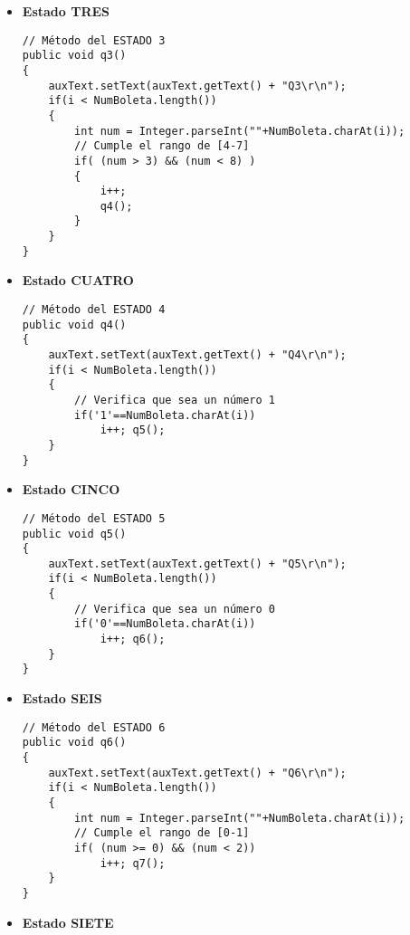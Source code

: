 \documentclass[12pt]{article}
\begin{document}
\begin{itemize}
		\begin{lstlisting}[style=Java]
// Método del ESTADO 2
public void q2()
{
	auxText.setText(auxText.getText() + "Q2\r\n");
	if(i < NumBoleta.length())
	{
		// Verifica que sea un número 1
		if('1'==NumBoleta.charAt(i))
			i++; q3();
	}	
}
		\end{lstlisting}

		\item[$\overrightarrow$] \textbf{Estado TRES}

		\begin{lstlisting}[style=Java]
// Método del ESTADO 3
public void q3()
{
	auxText.setText(auxText.getText() + "Q3\r\n");
	if(i < NumBoleta.length())
	{
		int num = Integer.parseInt(""+NumBoleta.charAt(i));
		// Cumple el rango de [4-7]
		if( (num > 3) && (num < 8) )
		{
			i++; 
			q4();
		}
	}
}
		\end{lstlisting}

		\item[$\overrightarrow$] \textbf{Estado CUATRO}

		\begin{lstlisting}[style=Java]
// Método del ESTADO 4
public void q4()
{
	auxText.setText(auxText.getText() + "Q4\r\n");
	if(i < NumBoleta.length())
	{
		// Verifica que sea un número 1
		if('1'==NumBoleta.charAt(i))
			i++; q5();
	}	
}
		\end{lstlisting}
\newpage

		\item[$\overrightarrow$] \textbf{Estado CINCO}

		\begin{lstlisting}[style=Java]
// Método del ESTADO 5
public void q5()
{
	auxText.setText(auxText.getText() + "Q5\r\n");
	if(i < NumBoleta.length())
	{
		// Verifica que sea un número 0
		if('0'==NumBoleta.charAt(i))
			i++; q6();
	}	
}
		\end{lstlisting}

		\item[$\overrightarrow$] \textbf{Estado SEIS}

		\begin{lstlisting}[style=Java]
// Método del ESTADO 6
public void q6()
{
	auxText.setText(auxText.getText() + "Q6\r\n");
	if(i < NumBoleta.length())
	{
		int num = Integer.parseInt(""+NumBoleta.charAt(i));
		// Cumple el rango de [0-1]
		if( (num >= 0) && (num < 2))
			i++; q7();
	}
}
		\end{lstlisting}

		\item[$\overrightarrow$] \textbf{Estado SIETE}


\end{itemize}
\end{document}
